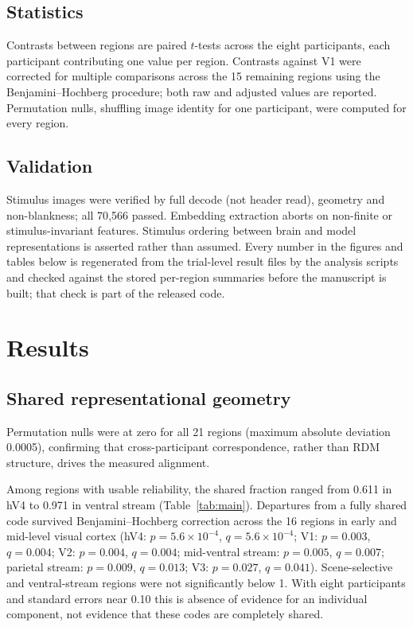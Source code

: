 \documentclass[11pt,a4paper]{article}
\begin{document}
\subsection{Statistics}

Contrasts between regions are paired $t$-tests across the eight participants,
each participant contributing one value per region. Contrasts against V1 were
corrected for multiple comparisons across the 15 remaining regions using the
Benjamini--Hochberg procedure; both raw and adjusted values are reported.
Permutation nulls, shuffling image identity for one participant, were computed
for every region.

\subsection{Validation}

Stimulus images were verified by full decode (not header read), geometry and
non-blankness; all 70{,}566 passed. Embedding extraction aborts on non-finite or
stimulus-invariant features. Stimulus ordering between brain and model
representations is asserted rather than assumed. Every number in the figures and
tables below is regenerated from the trial-level result files by the analysis
scripts and checked against the stored per-region summaries before the manuscript
is built; that check is part of the released code.

\section{Results}

\subsection{Shared representational geometry}

Permutation nulls were at zero for all 21 regions (maximum absolute deviation
\num{0.0005}), confirming that cross-participant correspondence, rather than RDM
structure, drives the measured alignment.

Among regions with usable reliability, the shared fraction ranged from
\num{0.611} in hV4 to \num{0.971} in ventral stream (Table~\ref{tab:main}).
Departures from a fully shared code survived Benjamini--Hochberg correction
across the 16 regions \citep{benjamini1995} in early and mid-level visual cortex
(hV4: $p = 5.6\times10^{-4}$, $q = 5.6\times10^{-4}$; V1: $p = 0.003$,
$q = 0.004$; V2: $p = 0.004$, $q = 0.004$; mid-ventral stream: $p = 0.005$,
$q = 0.007$; parietal stream: $p = 0.009$, $q = 0.013$; V3: $p = 0.027$,
$q = 0.041$). Scene-selective and ventral-stream regions were not significantly
below 1. With eight participants and standard errors near \num{0.10} this is
absence of evidence for an individual component, not evidence that these codes
are completely shared.
\end{document}

